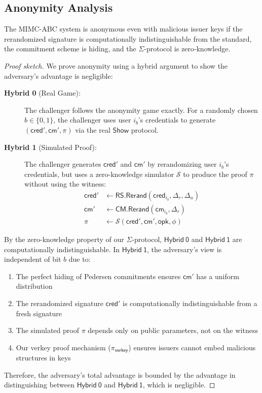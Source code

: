 \subsection{Anonymity Analysis}
\begin{theorem}[Anonymity]
The MIMC-ABC system is anonymous even with malicious issuer keys if the rerandomized signature is computationally indistinguishable from the standard, the commitment scheme is hiding, and the $\Sigma$-protocol is zero-knowledge.
\end{theorem}

\begin{proof}[Proof sketch]
We prove anonymity using a hybrid argument to show the adversary's advantage is negligible:

\begin{description}
    \item[\textbf{Hybrid 0} (Real Game):] The challenger follows the anonymity game exactly. For a randomly chosen $b \in \{0,1\}$, the challenger uses user $i_b$'s credentials to generate $(\mathsf{cred}', \mathsf{cm}', \pi)$ via the real $\mathsf{Show}$ protocol. 
    
    \item[\textbf{Hybrid 1} (Simulated Proof):] The challenger generates $\mathsf{cred}'$ and $\mathsf{cm}'$ by rerandomizing user $i_b$'s credentials, but uses a zero-knowledge simulator $\mathcal{S}$ to produce the proof $\pi$ without using the witness:
    \begin{align*}
        \mathsf{cred}' &\gets \mathsf{RS.Rerand}(\mathsf{cred}_{i_b}, \Delta_r, \Delta_u)\\
        \mathsf{cm}' &\gets \mathsf{CM.Rerand}(\mathsf{cm}_{i_b}, \Delta_r)\\
        \pi &\gets \mathcal{S}(\mathsf{cred}', \mathsf{cm}', \mathsf{opk}, \phi)
    \end{align*}
\end{description}

By the zero-knowledge property of our $\Sigma$-protocol, $\mathsf{Hybrid\:0}$ and $\mathsf{Hybrid\:1}$ are computationally indistinguishable. In $\mathsf{Hybrid\:1}$, the adversary's view is independent of bit $b$ due to:

\begin{enumerate}
    \item The perfect hiding of Pedersen commitments ensures $\mathsf{cm}'$ has a uniform distribution
    \item The rerandomized signature $\mathsf{cred}'$ is computationally indistinguishable from a fresh signature
    \item The simulated proof $\pi$ depends only on public parameters, not on the witness
    \item Our verkey proof mechanism ($\pi_{\mathsf{verkey}}$) ensures issuers cannot embed malicious structures in keys
\end{enumerate}

Therefore, the adversary's total advantage is bounded by the advantage in distinguishing between $\mathsf{Hybrid\:0}$ and $\mathsf{Hybrid\:1}$, which is negligible.
\end{proof}

